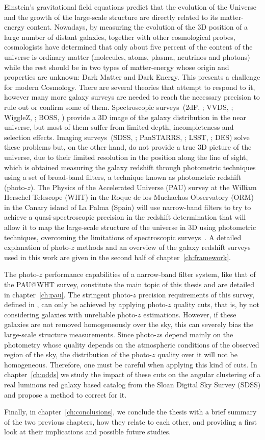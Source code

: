 Einstein's gravitational field equations predict that the evolution of the Universe and the growth of the large-scale structure are directly related to its matter-energy content. Nowadays, by measuring the evolution of the 3D position of a large number of distant galaxies, together with other cosmological probes, cosmologists have determined that only about five percent of the content of the universe is ordinary matter (molecules, atoms, plasma, neutrinos and photons) while the rest should be in two types of matter-energy whose origin and properties are unknown: Dark Matter and Dark Energy. This presents a challenge for modern Cosmology. There are several theories that attempt to respond to it, however many more galaxy surveys are needed to reach the necessary precision to rule out or confirm some of them. Spectroscopic surveys~(2dF, \citet{Colless2001}; VVDS, \citet{LeFevre2005}; WiggleZ, \citet{Drinkwater2010}; BOSS, \citet{Dawson2013}) provide a 3D image of the galaxy distribution in the near universe, but most of them suffer from limited depth, incompleteness and selection effects. Imaging surveys~(SDSS, \citet{York2000}; PanSTARRS, \citet{kaiser2000}; LSST, \citet{Tyson2003}; DES) solve these problems but, on the other hand, do not provide a true 3D picture of the universe, due to their limited resolution in the position along the line of sight, which is obtained measuring the galaxy redshift through photometric techniques using a set of broad-band filters, a technique known as photometric redshift (photo-$z$). The Physics of the Accelerated Universe (PAU) survey at the William Herschel Telescope (WHT) in the Roque de los Muchachos Observatory (ORM) in the Canary island of La Palma (Spain) will use narrow-band filters to try to achieve a quasi-spectroscopic precision in the redshift determination that will allow it to map the large-scale structure of the universe in 3D using photometric techniques, overcoming the limitations of spectroscopic surveys~\citep{Benitez2009}. A detailed explanation of photo-$z$ methods and an overview of the galaxy redshift surveys used in this work are given in the second half of chapter~\ref{ch:framework}.

The photo-$z$ performance capabilities of a narrow-band filter system, like that of the PAU@WHT survey, constitute the main topic of this thesis and are detailed in chapter~\ref{ch:pau}. The stringent photo-$z$ precision requirements of this survey, defined in \citet{Gaztanaga2012}, can only be achieved by applying photo-$z$ quality cuts, that is, by not considering galaxies with unreliable photo-$z$ estimations. However, if these galaxies are not removed homogeneously over the sky, this can severely bias the large-scale structure measurements. Since photo-$z$s depend mainly on the photometry whose quality depends on the atmospheric conditions of the observed region of the sky, the distribution of the photo-$z$ quality over it will not be homogeneous. Therefore, one must be careful when applying this kind of cuts. In chapter~\ref{ch:odds} we study the impact of these cuts on the angular clustering of a real luminous red galaxy based catalog \citep{Collister2007} from the Sloan Digital Sky Survey (SDSS) and propose a method to correct for it. 

Finally, in chapter~\ref{ch:conclusions}, we conclude the thesis with a brief summary of the two previous chapters, how they relate to each other, and providing a first look at their implications and possible future studies. 
